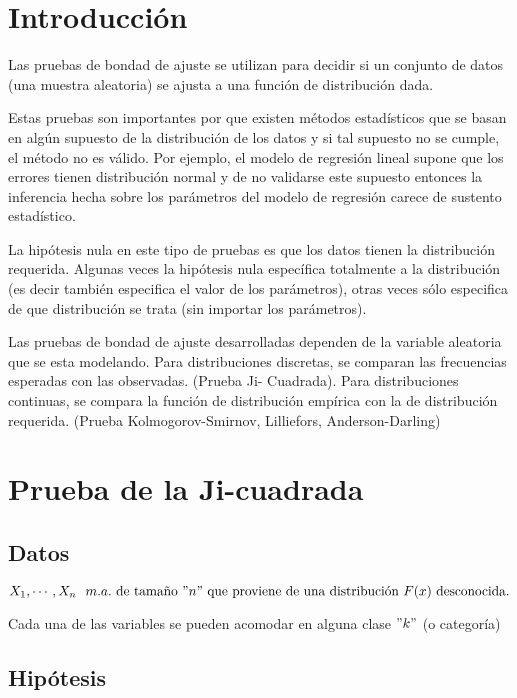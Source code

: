 \documentclass[
  a4paper,
  oneside,
  openany]{book}
\begin{document}
\hypertarget{introducciuxf3n-3}{%
\chapter*{Introducción}\label{introducciuxf3n-3}}


Las pruebas de bondad de ajuste se utilizan para decidir si un conjunto de datos (una muestra aleatoria) se ajusta a una función de distribución dada.

Estas pruebas son importantes por que existen métodos estadísticos que se basan en algún supuesto de la distribución de los datos y si tal supuesto no se cumple, el método no es válido. Por ejemplo, el modelo de regresión lineal supone que los errores tienen distribución normal y de no validarse este supuesto entonces la inferencia hecha sobre los parámetros del modelo de regresión carece de sustento estadístico.

La hipótesis nula en este tipo de pruebas es que los datos tienen la distribución requerida. Algunas veces la hipótesis nula específica totalmente a la distribución (es decir también especifica el valor de los parámetros), otras veces sólo especifica de que distribución se trata (sin importar los parámetros).

Las pruebas de bondad de ajuste desarrolladas dependen de la variable aleatoria que se esta modelando. Para distribuciones discretas, se comparan las frecuencias esperadas con las observadas. (Prueba Ji-
Cuadrada). Para distribuciones continuas, se compara la función de distribución empírica con la de distribución requerida. (Prueba Kolmogorov-Smirnov, Lilliefors, Anderson-Darling)

\hypertarget{prueba-de-la-ji-cuadrada}{%
\chapter{Prueba de la Ji-cuadrada}\label{prueba-de-la-ji-cuadrada}}

\hypertarget{datos-14}{%
\section{Datos}\label{datos-14}}

\[X_{1},\cdots,X_{n} \ \ m.a. \  \mbox{de tamaño} \  "n"\  \mbox{que proviene de una distribución} \  F(x) \  \mbox{desconocida.}\]

Cada una de las variables se pueden acomodar en alguna clase \("k"\) (o categoría)

\hypertarget{hipuxf3tesis-13}{%
\section{Hipótesis}\label{hipuxf3tesis-13}}
\end{document}
